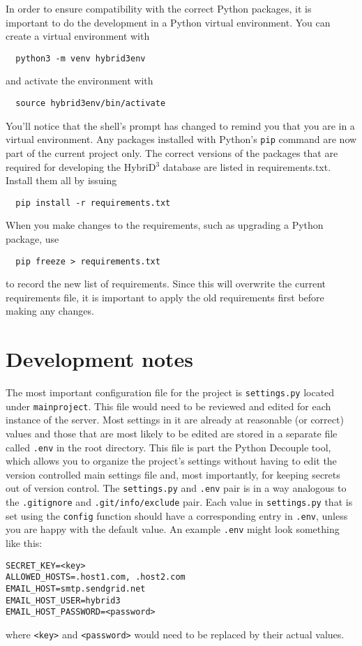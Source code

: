 \documentclass{article}
\begin{document}
In order to ensure compatibility with the correct Python packages, it is important to do the development in a Python virtual environment. You can create a virtual environment with
\begin{lstlisting}
  python3 -m venv hybrid3env
\end{lstlisting}
and activate the environment with
\begin{lstlisting}
  source hybrid3env/bin/activate
\end{lstlisting}
You'll notice that the shell's prompt has changed to remind you that you are in a virtual environment. Any packages installed with Python's \verb+pip+ command are now part of the current project only. The correct versions of the packages that are required for developing the HybriD$^3$ database are listed in requirements.txt. Install them all by issuing
\begin{lstlisting}
  pip install -r requirements.txt
\end{lstlisting}
When you make changes to the requirements, such as upgrading a Python package, use
\begin{lstlisting}
  pip freeze > requirements.txt
\end{lstlisting}
to record the new list of requirements. Since this will overwrite the current requirements file, it is important to apply the old requirements first before making any changes.

\section{Development notes}

The most important configuration file for the project is \texttt{settings.py} located under \texttt{mainproject}. This file would need to be reviewed and edited for each instance of the server. Most settings in it are already at reasonable (or correct) values and those that are most likely to be edited are stored in a separate file called \texttt{.env} in the root directory. This file is part the Python Decouple tool, which allows you to organize the project's settings without having to edit the version controlled main settings file and, most importantly, for keeping secrets out of version control. The \texttt{settings.py} and \texttt{.env} pair is in a way analogous to the \texttt{.gitignore} and \texttt{.git/info/exclude} pair. Each value in \texttt{settings.py} that is set using the \texttt{config} function should have a corresponding entry in \texttt{.env}, unless you are happy with the default value. An example \texttt{.env} might look something like this:
\begin{lstlisting}
SECRET_KEY=<key>
ALLOWED_HOSTS=.host1.com, .host2.com
EMAIL_HOST=smtp.sendgrid.net
EMAIL_HOST_USER=hybrid3
EMAIL_HOST_PASSWORD=<password>
\end{lstlisting}
where \texttt{<key>} and \texttt{<password>} would need to be replaced by their actual values.
\end{document}
